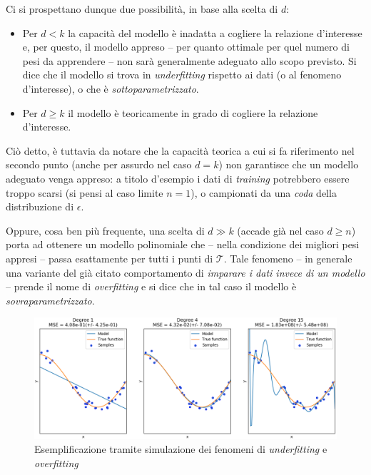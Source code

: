 \documentclass[a4paper, twoside]{article}
\begin{document}
Ci si prospettano dunque due possibilità, in base alla scelta di $d$:

\begin{itemize}
	\item {Per $d < k$ la capacità del modello è inadatta a cogliere la relazione d'interesse e, per questo, il modello appreso -- per quanto ottimale per quel numero di pesi da apprendere -- non sarà generalmente adeguato allo scopo previsto. Si dice che il modello si trova in \textit{underfitting} rispetto ai dati (o al fenomeno d'interesse), o che è \textit{sottoparametrizzato}.}
	\item {Per $d \geq k$ il modello è teoricamente in grado di cogliere la relazione d'interesse.}
\end{itemize}

Ciò detto, è tuttavia da notare che la capacità teorica a cui si fa riferimento nel secondo punto (anche per assurdo nel caso $d=k$) non garantisce che un modello adeguato venga appreso: a titolo d'esempio i dati di \textit{training} potrebbero essere troppo scarsi (si pensi al caso limite $n=1$), o campionati da una \textit{coda} della distribuzione di $\epsilon$.

Oppure, cosa ben più frequente, una scelta di $d \gg k$ (accade già nel caso $d \geq n$) porta ad ottenere un modello polinomiale che -- nella condizione dei migliori pesi appresi -- passa esattamente per tutti i punti di $\mathcal{T}$. Tale fenomeno -- in generale una variante del già citato comportamento di \textit{imparare i dati invece di un modello} -- prende il nome di \textit{overfitting} e si dice che in tal caso il modello è \textit{sovraparametrizzato}.

\begin{figure}[H]
	\centering
	\includegraphics[scale=0.4]{finding-the-perfect-fit.png}
	\captionsetup{labelformat=empty}
	\caption{Esemplificazione tramite simulazione dei fenomeni di \textit{underfitting} e \textit{overfitting}}
\end{figure}
\end{document}
